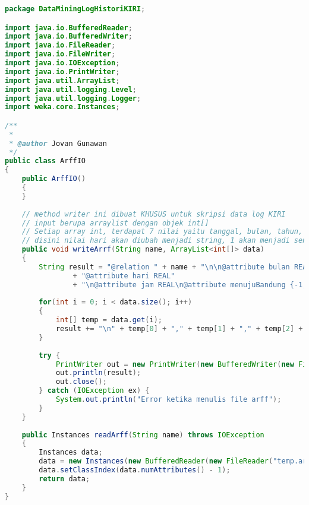\begin{lstlisting}[language=Java,basicstyle=\tiny,caption=ArffIO.java]
package DataMiningLogHistoriKIRI;

import java.io.BufferedReader;
import java.io.BufferedWriter;
import java.io.FileReader;
import java.io.FileWriter;
import java.io.IOException;
import java.io.PrintWriter;
import java.util.ArrayList;
import java.util.logging.Level;
import java.util.logging.Logger;
import weka.core.Instances;

/**
 *
 * @author Jovan Gunawan
 */
public class ArffIO 
{
    public ArffIO()
    {
    }
    
    // method writer ini dibuat KHUSUS untuk skripsi data log KIRI
    // input berupa arraylist dengan objek int[]
    // Setiap array int, terdapat 7 nilai yaitu tanggal, bulan, tahun, hari, jam, menit, menujuBandung
    // disini nilai hari akan diubah menjadi string, 1 akan menjadi senin, ..., dan 7 akan menjadi minggu
    public void writeArrf(String name, ArrayList<int[]> data)
    {
        String result = "@relation " + name + "\n\n@attribute bulan REAL\n@attribute tahun REAL\n"
                + "@attribute hari REAL"
                + "\n@attribute jam REAL\n@attribute menujuBandung {-1,0,1}\n\n@data";
        
        for(int i = 0; i < data.size(); i++)
        {
            int[] temp = data.get(i);
            result += "\n" + temp[0] + "," + temp[1] + "," + temp[2] + "," + temp[3] + "," + temp[4]; 
        }
        
        try {
            PrintWriter out = new PrintWriter(new BufferedWriter(new FileWriter("temp.arff")));
            out.println(result);
            out.close();
        } catch (IOException ex) {
            System.out.println("Error ketika menulis file arff");
        }
    }
    
    public Instances readArff(String name) throws IOException
    {
        Instances data;
        data = new Instances(new BufferedReader(new FileReader("temp.arff")));
        data.setClassIndex(data.numAttributes() - 1);
        return data;
    }
}
\end{lstlisting}

